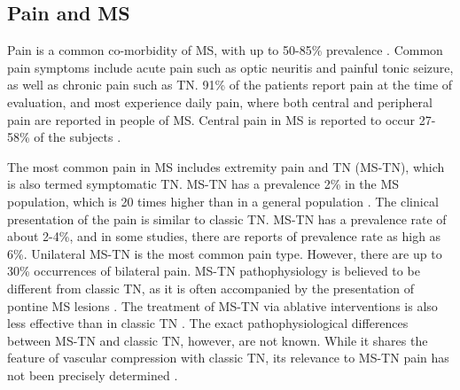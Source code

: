 \subsection{Pain and MS}
Pain is a common co-morbidity of MS, with up to 50-85\% prevalence \cite{Osterberg2005}. Common pain symptoms include acute pain such as optic neuritis and painful tonic seizure, as well as chronic pain such as TN. 91\% of the patients report pain at the time of evaluation, and most experience daily pain, where both central and peripheral pain are reported in people of MS. Central pain in MS is reported to occur 27-58\% of the subjects \cite{OConnor2008}. 

The most common pain in MS includes extremity pain and TN (MS-TN), which is also termed symptomatic TN. MS-TN has a prevalence 2\% in the MS population, which is 20 times higher than in a general population \cite{Cruccu2009}. The clinical presentation of the pain is similar to classic TN. MS-TN has a prevalence rate of about 2-4\%, and in some studies, there are reports of prevalence rate as high as 6\%. Unilateral MS-TN is the most common pain type. However, there are up to 30\% occurrences of bilateral pain. MS-TN pathophysiology is believed to be different from classic TN, as it is often accompanied by the presentation of pontine MS lesions \cite{Cruccu2009}. The treatment of MS-TN via ablative interventions is also less effective than in classic TN \cite{Nurmikko2009}. The exact pathophysiological differences between MS-TN and classic TN, however, are not known. While it shares the feature of vascular compression with classic TN, its relevance to MS-TN pain has not been precisely determined \cite{Nurmikko2009}.